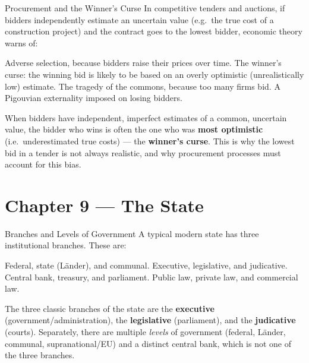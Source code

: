\begin{question}[type=mc]{Procurement and the Winner's Curse}
In competitive tenders and auctions, if bidders independently estimate an
uncertain value (e.g.\ the true cost of a construction project) and the
contract goes to the lowest bidder, economic theory warns of:
\begin{choices}
  \choice        Adverse selection, because bidders raise their prices over
                 time.
  \correctchoice The winner's curse: the winning bid is likely to be based on
                 an overly optimistic (unrealistically low) estimate.
  \choice        The tragedy of the commons, because too many firms bid.
  \choice        A Pigouvian externality imposed on losing bidders.
\end{choices}
\begin{solution}
  When bidders have independent, imperfect estimates of a common, uncertain
  value, the bidder who wins is often the one who was \textbf{most
  optimistic} (i.e.\ underestimated true costs) — the \textbf{winner's
  curse}. This is why the lowest bid in a tender is not always realistic,
  and why procurement processes must account for this bias.
\end{solution}
\end{question}


\section{Chapter 9 — The State}

\begin{question}[type=mc]{Branches and Levels of Government}
A typical modern state has three institutional branches. These are:
\begin{choices}
  \choice        Federal, state (L\"ander), and communal.
  \correctchoice Executive, legislative, and judicative.
  \choice        Central bank, treasury, and parliament.
  \choice        Public law, private law, and commercial law.
\end{choices}
\begin{solution}
  The three classic branches of the state are the \textbf{executive}
  (government/administration), the \textbf{legislative} (parliament), and
  the \textbf{judicative} (courts). Separately, there are multiple
  \emph{levels} of government (federal, Länder, communal, supranational/EU)
  and a distinct central bank, which is not one of the three branches.
\end{solution}
\end{question}

